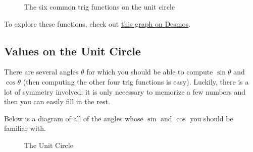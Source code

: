 \begin{figure}[h!]
{
}
\caption{The six common trig functions on the unit circle}
\label{6trig}
\end{figure}


To explore these functions, check out \href{https://www.desmos.com/calculator/fdr54f2jh3}{this graph on Desmos}.


\subsection{Values on the Unit Circle}

There are several angles $\theta$ for which you should be able to compute $\sin\theta$ and $\cos\theta$ (then computing the other four trig functions is easy). Luckily, there is a lot of symmetry involved: it is only necessary to memorize a few numbers and then you can easily fill in the rest.

Below is a diagram of all of the angles whose $\sin$ and $\cos$ you should be familiar with.

\begin{figure}[h!]
\label{the-unit-circle}
\centering
{}
\caption{The Unit Circle}
\end{figure}


